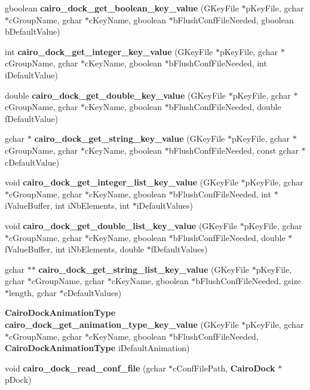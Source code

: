 \begin{CompactItemize}
\item 
gboolean {\bf cairo\_\-dock\_\-get\_\-boolean\_\-key\_\-value} (GKey\-File $\ast$p\-Key\-File, gchar $\ast$c\-Group\-Name, gchar $\ast$c\-Key\-Name, gboolean $\ast$b\-Flush\-Conf\-File\-Needed, gboolean b\-Default\-Value)
\item 
int {\bf cairo\_\-dock\_\-get\_\-integer\_\-key\_\-value} (GKey\-File $\ast$p\-Key\-File, gchar $\ast$c\-Group\-Name, gchar $\ast$c\-Key\-Name, gboolean $\ast$b\-Flush\-Conf\-File\-Needed, int i\-Default\-Value)
\item 
double {\bf cairo\_\-dock\_\-get\_\-double\_\-key\_\-value} (GKey\-File $\ast$p\-Key\-File, gchar $\ast$c\-Group\-Name, gchar $\ast$c\-Key\-Name, gboolean $\ast$b\-Flush\-Conf\-File\-Needed, double f\-Default\-Value)
\item 
gchar $\ast$ {\bf cairo\_\-dock\_\-get\_\-string\_\-key\_\-value} (GKey\-File $\ast$p\-Key\-File, gchar $\ast$c\-Group\-Name, gchar $\ast$c\-Key\-Name, gboolean $\ast$b\-Flush\-Conf\-File\-Needed, const gchar $\ast$c\-Default\-Value)
\item 
void {\bf cairo\_\-dock\_\-get\_\-integer\_\-list\_\-key\_\-value} (GKey\-File $\ast$p\-Key\-File, gchar $\ast$c\-Group\-Name, gchar $\ast$c\-Key\-Name, gboolean $\ast$b\-Flush\-Conf\-File\-Needed, int $\ast$i\-Value\-Buffer, int i\-Nb\-Elements, int $\ast$i\-Default\-Values)
\item 
void {\bf cairo\_\-dock\_\-get\_\-double\_\-list\_\-key\_\-value} (GKey\-File $\ast$p\-Key\-File, gchar $\ast$c\-Group\-Name, gchar $\ast$c\-Key\-Name, gboolean $\ast$b\-Flush\-Conf\-File\-Needed, double $\ast$f\-Value\-Buffer, int i\-Nb\-Elements, double $\ast$f\-Default\-Values)
\item 
gchar $\ast$$\ast$ {\bf cairo\_\-dock\_\-get\_\-string\_\-list\_\-key\_\-value} (GKey\-File $\ast$p\-Key\-File, gchar $\ast$c\-Group\-Name, gchar $\ast$c\-Key\-Name, gboolean $\ast$b\-Flush\-Conf\-File\-Needed, gsize $\ast$length, gchar $\ast$c\-Default\-Values)
\item 
{\bf Cairo\-Dock\-Animation\-Type} {\bf cairo\_\-dock\_\-get\_\-animation\_\-type\_\-key\_\-value} (GKey\-File $\ast$p\-Key\-File, gchar $\ast$c\-Group\-Name, gchar $\ast$c\-Key\-Name, gboolean $\ast$b\-Flush\-Conf\-File\-Needed, {\bf Cairo\-Dock\-Animation\-Type} i\-Default\-Animation)
\item 
void {\bf cairo\_\-dock\_\-read\_\-conf\_\-file} (gchar $\ast$c\-Conf\-File\-Path, {\bf Cairo\-Dock} $\ast$p\-Dock)
\item 
$$
\end{CompactItemize}
